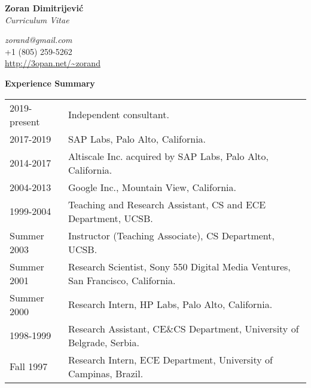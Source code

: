 \documentclass[10pt]{article}
\renewcommand{\section}[1]{ \vspace{10pt}\begin{flushleft}{\hspace{-0.2in }\Large\bf
    #1}\end{flushleft}\nopagebreak }
\begin{document}
\begin{center}
\vspace{-1.5in}
  {\Large\bf Zoran Dimitrijevi\'{c}}\\
  {\large\em Curriculum Vitae}
\end{center}

\begin{center}
{\em zorand@gmail.com}\\
+1 (805) 259-5262\\
\url{http://3opan.net/~zorand}
\end{center}

%

\vspace{-5pt}
\section{Experience Summary}

\begin{tabular}{ll}
2019-present    & Independent consultant.\\
2017-2019       & SAP Labs, Palo Alto, California.\\
2014-2017       & Altiscale Inc. acquired by SAP Labs, Palo Alto, California.\\
2004-2013       & Google Inc., Mountain View, California.\\
1999-2004	& Teaching and Research Assistant, 
			CS and ECE Department, UCSB. \\
Summer 2003	& Instructor (Teaching Associate), CS Department, UCSB. \\
Summer 2001	& Research Scientist, Sony 550 Digital Media Ventures, 
			San Francisco, California. \\
Summer 2000	& Research Intern, HP Labs, Palo Alto, California. \\
1998-1999	& Research Assistant, CE\&CS Department, University of Belgrade, Serbia.\\
Fall 1997	& Research Intern, ECE Department, University of Campinas, Brazil. \\
\end{tabular}
\end{document}
